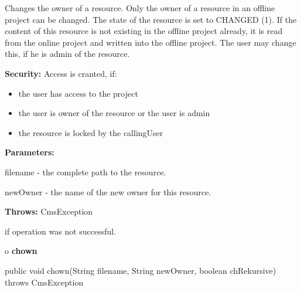\begin{description}
\htmlDD Changes the owner of a resource. \htmlBR
Only the owner of a resource in an offline project can be changed. The state
of the resource is set to CHANGED (1). If the content of this resource is not
existing in the offline project already, it is read from the online project
and written into the offline project. The user may change this, if he is admin
of the resource. 

{\bf Security:} Access is cranted, if: 

\begin{itemize}
\item the user has access to the project 
\item the user is owner of the resource or the user is admin 
\item the resource is locked by the callingUser 
\end{itemize}

\begin{description}
\item {\bf Parameters:}  

filename - the complete path to the resource.  

newOwner - the name of the new owner for this resource.  
\item {\bf Throws:} CmsException  

if operation was not successful.  
\end{description}

\end{description}

o {\bf chown} 

\begin{PRE}
 public void chown(String filename,
                   String newOwner,
                   boolean chRekursive) throws CmsException
\end{PRE}

